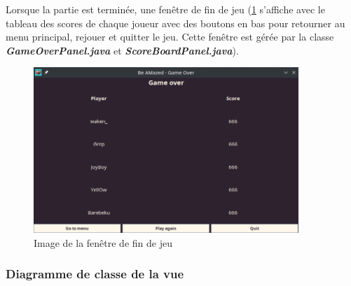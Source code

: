 Lorsque la partie est terminée, une fenêtre de fin de jeu (\ref{fig:GameOverWindow} s'affiche avec le tableau des scores de chaque joueur avec des boutons en bas pour retourner au menu principal, rejouer et quitter le jeu. Cette fenêtre est gérée par la classe \textbf{\textit{GameOverPanel.java}} et \textbf{\textit{ScoreBoardPanel.java}}).

\begin{figure}[!htb]%
    \centering
    \includegraphics[width=10cm]{ressources/Implementation/Labyrinthe/Vue/GameOver.png}%
    \caption{Image de la fenêtre de fin de jeu}%
    \label{fig:GameOverWindow}
\end{figure}
\FloatBarrier

\subsubsection*{Diagramme de classe de la vue}
